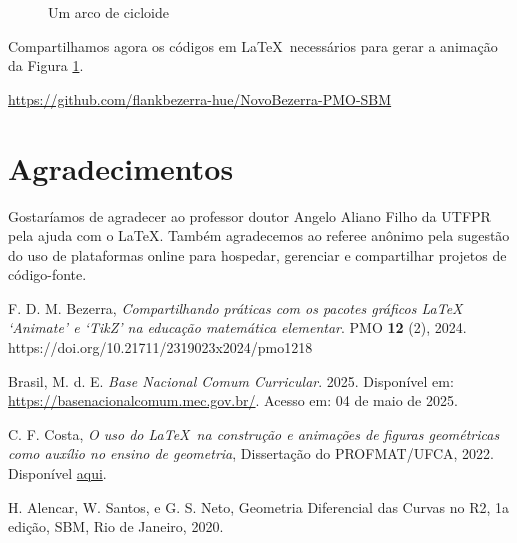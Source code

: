 \documentclass[10pt]{article}
\theoremstyle{plain} %
\theoremstyle{definition} %
\theoremstyle{remark} %
\begin{document}
\begin{figure}[!htp]
\centering
\begin{animateinline}[poster = last, controls]{25}
\end{animateinline}
\caption{Um arco de cicloide}
\label{FigArcCicloide}
\end{figure}

Compartilhamos agora os códigos em  \LaTeX\ necessários para gerar a animação da Figura \ref{FigArcCicloide}.


\href{https://github.com/flankbezerra-hue/NovoBezerra-PMO-SBM}{https://github.com/flankbezerra-hue/NovoBezerra-PMO-SBM}


\section*{Agradecimentos}

Gostaríamos de agradecer ao professor doutor Angelo Aliano Filho da UTFPR pela ajuda com o \LaTeX. Também agradecemos ao referee anônimo pela sugestão do uso de plataformas online para hospedar, gerenciar e compartilhar projetos de código-fonte.




\begin{thebibliography}{}	
F. D. M. Bezerra, \textit{Compartilhando práticas com os pacotes gráficos LaTeX ‘Animate’ e ‘TikZ’
na educação matemática elementar}. PMO {\bf 12} (2), 2024.  https://doi.org/10.21711/2319023x2024/pmo1218


Brasil, M. d. E. 
\textit{Base Nacional Comum Curricular}.
2025.
Disponível em: \url{https://basenacionalcomum.mec.gov.br/}.
Acesso em: 04 de maio de 2025.

C. F. Costa, \textit{O uso do \LaTeX\ na construção e animações de figuras geométricas como auxílio no ensino de geometria}, Dissertação do PROFMAT/UFCA, 2022. Disponível \href{https://sca.profmat-sbm.org.br/profmat_tcc.php?id1=6814&id2=171053976}{aqui}.

 H. Alencar, W. Santos, e G. S. Neto, Geometria Diferencial das Curvas no R2, 1a edição, SBM, Rio de Janeiro, 2020.
\end{thebibliography}

 
\end{document}

